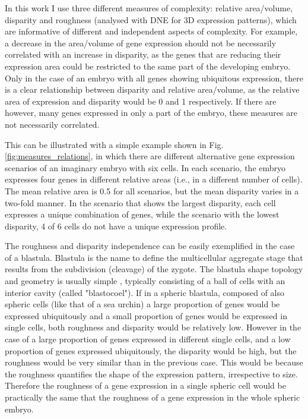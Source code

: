 In this work I use three different measures of complexity: relative area/volume, disparity and roughness (analysed with DNE for 3D expression patterns), which are informative of different and independent aspects of complexity. For example, a decrease in the area/volume of gene expression should not be necessarily correlated with an increase in disparity, as the genes that are reducing their expression area could be restricted to the same part of the developing embryo. Only in the case of an embryo with all genes showing ubiquitous expression, there is a clear relationship between disparity and relative area/volume, as the relative area of expression and disparity would be 0 and 1 respectively. If there are however, many genes expressed in only a part of the embryo, these measures are not necessarily correlated. 

This can be illustrated with a simple example shown in Fig. \ref{fig:measures_relations}, in which there are different alternative gene expression scenarios of an imaginary embryo with six cells. In each scenario, the embryo expresses four genes in different relative areas (i.e., in a different number of cells). The mean relative area is 0.5 for all scenarios, but the mean disparity varies in a two-fold manner. In the scenario that shows the largest disparity, each cell expresses a unique combination of genes, while the scenario with the lowest disparity, 4 of 6 cells do not have a unique expression profile.

The roughness and disparity independence can be easily exemplified in the case of a blastula. Blastula is the name to define the multicellular aggregate stage that results from the subdivision (cleavage) of the zygote. The blastula shape topology and geometry is usually simple \citep{Forgacs_Newman2005}, typically consisting of a ball of cells with an interior cavity (called "blastocoel"). If in a spheric blastula, composed of also spheric cells (like that of a sea urchin) a large proportion of genes would be expressed ubiquitously and a small proportion of genes would be expressed in single cells, both roughness and disparity would be relatively low.
However in the case of a large proportion of genes expressed in different single cells, and a low proportion of genes expressed ubiquitously, the disparity would be high, but the roughness would be very similar than in the previous case. This would be because the roughness quantifies the shape of the expression pattern, irrespective to size. Therefore the roughness of a gene expression in a single spheric cell would be practically the same that the roughness of a gene expression in the whole spheric embryo.

